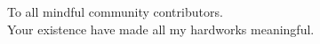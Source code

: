 \begin{dedication}
  To all mindful community contributors.\\ 
  \vspace{1em}
  Your existence have made all my hardworks meaningful. 
\end{dedication}
